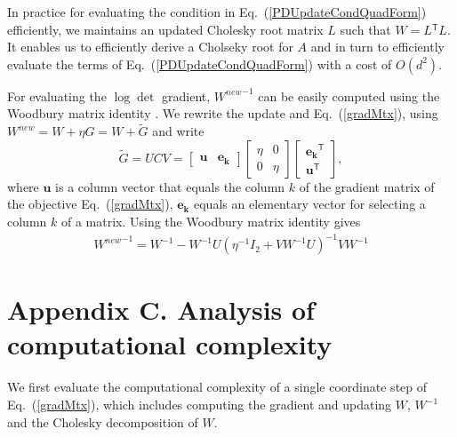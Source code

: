 \documentclass[twoside,11pt]{article}
\newcommand\mat[1]{{#1}}
\renewcommand\vec[1]{\mathbf{#1}}
\newcommand{\T}{{}^\mathsf{T}}
\newcommand{\W}{\mat{W}}
\newcommand{\newW}{{\mat{W^{new}}}}
\newcommand{\cholL}{\mat{L}}
\newcommand{\A}{\mat{A}}
\renewcommand{\eqref}[1]{Eq.~(\ref{#1})}
\begin{document}
In practice for evaluating the condition in \eqref{PDUpdateCondQuadForm} efficiently, we maintains an updated Cholesky root matrix $\cholL$ such that $\W = \cholL\T \cholL$. It enables us to efficiently derive a Cholseky root for $\A$ \citep{Davis05rowchol} and in turn to efficiently evaluate the terms of \eqref{PDUpdateCondQuadForm} with a cost of $O(d^2)$. 

For evaluating the $\log\det$ gradient, $\newW^{-1}$ can be easily computed using the Woodbury matrix
identity \citep{woodbury1950inverting}. We rewrite the update and \eqref{gradMtx}, using $\newW = \W + \eta G = \W+\mat{\widetilde{G}}$
and write
\begin{equation}
  \mat{\widetilde{G}} = \mat{U}\mat{C}\mat{V} = \left[ \begin{matrix}
      \vec{u} & \vec{e_k} \end{matrix} \right] \left[ \begin{matrix}
      \eta & 0 \\ 0 & \eta \end{matrix} \right] \left[ \begin{matrix}
      \vec{e_k}\T \\ \vec{u}\T \end{matrix} \right],
  \label{gradMtxWDB}
  \nonumber 
\end{equation}
where $\vec{u}$ is a column vector that equals the column $k$ of the gradient matrix of the objective \eqref{gradMtx},
$\vec{e_k}$ equals an elementary vector for selecting a column $k$ of
a matrix. 
Using the Woodbury matrix identity gives 
\begin{equation}
    \begin{array}{lcl}
    \newW^{-1} = 
    \W^{-1} - \W^{-1} \mat{U} (\eta^{-1} I_2 + \mat{V}     \W^{-1} \mat{U})^{-1} \mat{V} \W^{-1}
    \end{array}
    \nonumber
    \label{InvWwdb}
\end{equation}

 

\section*{Appendix C. Analysis of computational complexity}


We first evaluate the computational complexity of a single coordinate step of  \eqref{gradMtx}, which includes computing the gradient and updating $\W$, $\W^{-1}$ and the Cholesky decomposition of $\W$.
\end{document}
